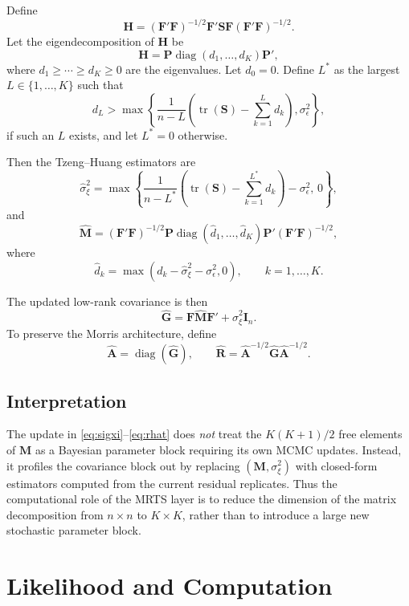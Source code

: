 \documentclass[11pt]{article}
\newcommand{\bF}{\mathbf{F}}
\newcommand{\bH}{\mathbf{H}}
\newcommand{\bG}{\mathbf{G}}
\newcommand{\bM}{\mathbf{M}}
\newcommand{\bR}{\mathbf{R}}
\newcommand{\bA}{\mathbf{A}}
\newcommand{\bS}{\mathbf{S}}
\newcommand{\bP}{\mathbf{P}}
\newcommand{\diag}{\operatorname{diag}}
\newcommand{\tr}{\operatorname{tr}}
\newcommand{\I}{\mathbf{I}}
\begin{document}
Define
\[
\bH = (\bF' \bF)^{-1/2} \bF' \bS \bF (\bF' \bF)^{-1/2}.
\]
Let the eigendecomposition of $\bH$ be
\[
\bH = \bP \diag(d_1, \ldots, d_K) \bP',
\]
where $d_1 \ge \cdots \ge d_K \ge 0$ are the eigenvalues. Let $d_0 = 0$. Define
$L^*$ as the largest $L \in \{1, \ldots, K\}$ such that
\[
d_L >
\max \left\{
\frac{1}{n-L}
\left(
\tr(\bS) - \sum_{k=1}^L d_k
\right),
\sigma_\epsilon^2
\right\},
\]
if such an $L$ exists, and let $L^* = 0$ otherwise.

Then the Tzeng--Huang estimators are
\begin{equation}
\widehat{\sigma}_{\xi}^2
=
\max \left\{
\frac{1}{n-L^*}
\left(
\tr(\bS) - \sum_{k=1}^{L^*} d_k
\right)
- \sigma_\epsilon^2,
\,
0
\right\},
\label{eq:sigxi}
\end{equation}
and
\begin{equation}
\widehat{\bM}
=
(\bF' \bF)^{-1/2}
\bP
\diag(\hat d_1, \ldots, \hat d_K)
\bP'
(\bF' \bF)^{-1/2},
\label{eq:mhat}
\end{equation}
where
\[
\hat d_k = \max(d_k - \widehat{\sigma}_{\xi}^2 - \sigma_\epsilon^2, 0),
\qquad
k = 1, \ldots, K.
\]

The updated low-rank covariance is then
\begin{equation}
\widehat{\bG} = \bF \widehat{\bM} \bF' + \widehat{\sigma}_{\xi}^2 \I_n.
\label{eq:ghat}
\end{equation}
To preserve the Morris architecture, define
\begin{equation}
\widehat{\bA} = \diag(\widehat{\bG}),
\qquad
\widehat{\bR} = \widehat{\bA}^{-1/2} \widehat{\bG} \widehat{\bA}^{-1/2}.
\label{eq:rhat}
\end{equation}

\subsection{Interpretation}

The update in \eqref{eq:sigxi}--\eqref{eq:rhat} does \emph{not} treat the
$K(K+1)/2$ free elements of $\bM$ as a Bayesian parameter block requiring its
own MCMC updates. Instead, it profiles the covariance block out by replacing
$(\bM, \sigma_\xi^2)$ with closed-form estimators computed from the current
residual replicates. Thus the computational role of the MRTS layer is to reduce
the dimension of the matrix decomposition from $n \times n$ to $K \times K$,
rather than to introduce a large new stochastic parameter block.

\section{Likelihood and Computation}
\end{document}
